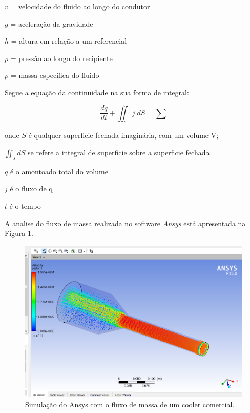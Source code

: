 		$v$ = velocidade do fluido ao longo do condutor

		$g$ = aceleração da gravidade
		
		$h$ = altura em relação a um referencial
		
		$p$ = pressão ao longo do recipiente
		
		$\rho$ = massa específica do fluido

		Segue a equação da continuidade na sua forma de integral:

		\begin{equation}
		\frac{dq}{dt} + \iint_{s}^{ }j . dS= \sum
		\end{equation}
		
		onde $S$ é qualquer superficie fechada imaginária, com um volume V;

		$\iint_{s}^{ }dS$ se refere a integral de superficie sobre a superficie fechada

		$q$ é o amontoado total do volume

		$j$ é o fluxo de q

		$t$ é o tempo


		A analise do fluxo de massa realizada no software \textit{Ansys} está apresentada na Figura \ref{img:analise_fluxo}.

		\begin{figure}[H]
			\centering
			\includegraphics[scale=0.4]{figuras/analise_fluxo.png}
			\caption{Simulação do Ansys com o fluxo de massa de um cooler comercial.}
			\label{img:analise_fluxo}
		\end{figure}




